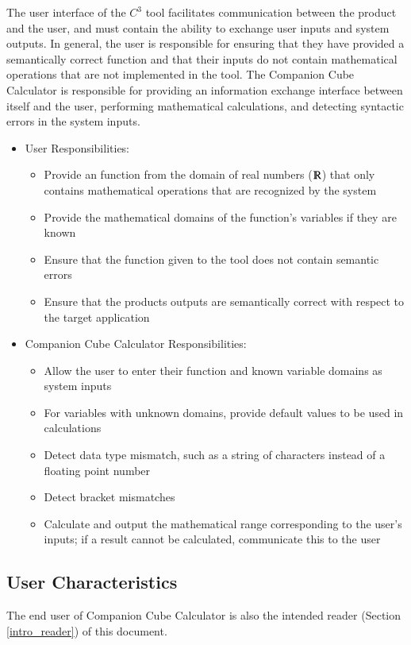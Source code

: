 \documentclass[12pt]{article}
\newcommand{\progname}{Companion Cube Calculator} %
\newcommand{\prognameAbbrv}{$C^{3}$}
\begin{document}
The user interface of the \prognameAbbrv{} tool facilitates communication 
between the product and the user, and must contain the ability to exchange user 
inputs and system outputs. In general, the user is responsible for ensuring 
that they have provided a semantically correct function and that their inputs 
do not contain mathematical operations that are not implemented in the tool. 
The \progname{} is responsible for providing an information exchange interface 
between itself and the user, performing mathematical calculations, and 
detecting syntactic errors in the system inputs.

\begin{itemize}
	\item User Responsibilities:
	\begin{itemize}
		\item Provide an function from the domain of real numbers 
		($\varmathbb{R}$) that only contains mathematical operations that are 
		recognized by the system
		\item Provide the mathematical domains of the function's variables if 
		they are known
		\item Ensure that the function given to the tool does not contain 
		semantic errors
		\item Ensure that the products outputs are semantically correct with 
		respect to the target application
	\end{itemize}
	\item \progname{} Responsibilities:
	\begin{itemize}
		\item Allow the user to enter their function and known variable domains 
		as system inputs
		\item For variables with unknown domains, provide default values to be 
		used in calculations
		\item Detect data type mismatch, such as a string of characters instead 
		of a floating point number
		\item Detect bracket mismatches
		\item Calculate and output the mathematical range corresponding to the 
		user's inputs; if a result cannot be calculated, communicate this to 
		the user
	\end{itemize}
\end{itemize}

\subsection{User Characteristics} \label{SecUserCharacteristics}
The end user of \progname{} is also the intended reader (Section 
\ref{intro_reader}) of this document.
\end{document}
